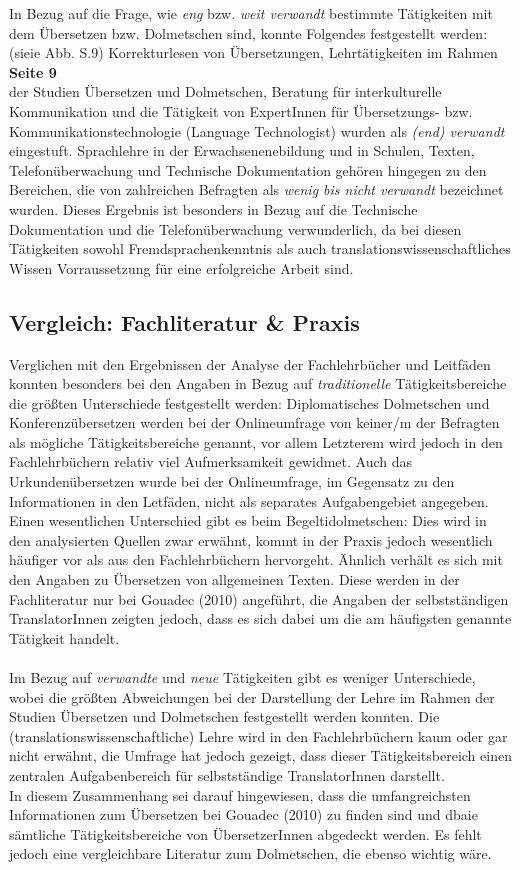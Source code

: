 \documentclass{article}
\begin{document}
	In Bezug auf die Frage, wie \textit{eng} bzw. \textit{weit verwandt} bestimmte Tätigkeiten mit dem Übersetzen bzw. Dolmetschen sind, konnte Folgendes festgestellt werden: (sieie Abb. S.9) Korrekturlesen von Übersetzungen, Lehrtätigkeiten im Rahmen \\
	\textbf{Seite 9} \\
	der Studien Übersetzen und Dolmetschen, Beratung für interkulturelle Kommunikation und die Tätigkeit von ExpertInnen für Übersetzungs- bzw. Kommunikationstechnologie (Language Technologist) wurden als \textit{(end) verwandt} eingestuft. Sprachlehre in der Erwachsenenebildung und in Schulen, Texten, Telefonüberwachung und Technische Dokumentation gehören hingegen zu den Bereichen, die von zahlreichen Befragten als \textit{wenig bis nicht verwandt} bezeichnet wurden. Dieses Ergebnis ist besonders in Bezug auf die Technische Dokumentation und die Telefonüberwachung verwunderlich, da bei diesen Tätigkeiten sowohl Fremdsprachenkenntnis als auch translationswissenschaftliches Wissen Vorraussetzung für eine erfolgreiche Arbeit sind.
	\subsection*{Vergleich: Fachliteratur \& Praxis}
	Verglichen mit den Ergebnissen der Analyse der Fachlehrbücher und Leitfäden konnten besonders bei den Angaben in Bezug auf \textit{traditionelle} Tätigkeitsbereiche die größten Unterschiede festgestellt werden: Diplomatisches Dolmetschen und Konferenzübersetzen werden bei der Onlineumfrage von keiner/m der Befragten als mögliche Tätigkeitsbereiche genannt, vor allem Letzterem wird jedoch in den Fachlehrbüchern relativ viel Aufmerksamkeit gewidmet. Auch das Urkundenübersetzen wurde bei der Onlineumfrage, im Gegensatz zu den Informationen in den Letfäden, nicht als separates Aufgabengebiet angegeben. Einen wesentlichen Unterschied gibt es beim Begeltidolmetschen: Dies wird in den analysierten Quellen zwar erwähnt, kommt in der Praxis jedoch wesentlich häufiger vor als aus den Fachlehrbüchern hervorgeht. Ähnlich verhält es sich mit den Angaben zu Übersetzen von allgemeinen Texten. Diese werden in der Fachliteratur nur bei Gouadec (2010) angeführt, die Angaben der selbstständigen TranslatorInnen zeigten jedoch, dass es sich dabei um die am häufigsten genannte Tätigkeit handelt. \\ \\
	Im Bezug auf \textit{verwandte} und \textit{neue} Tätigkeiten gibt es weniger Unterschiede, wobei die größten Abweichungen bei der Darstellung der Lehre im Rahmen der Studien Übersetzen und Dolmetschen festgestellt werden konnten. Die (translationswissenschaftliche) Lehre wird in den Fachlehrbüchern kaum oder gar nicht erwähnt, die Umfrage hat jedoch gezeigt, dass dieser Tätigkeitsbereich einen zentralen Aufgabenbereich für selbstständige TranslatorInnen darstellt. \\
	In diesem Zusammenhang sei darauf hingewiesen, dass die umfangreichsten Informationen zum Übersetzen bei Gouadec (2010) zu finden sind und dbaie sämtliche Tätigkeitsbereiche von ÜbersetzerInnen abgedeckt werden. Es fehlt jedoch eine vergleichbare Literatur zum Dolmetschen, die ebenso wichtig wäre.
\end{document}
